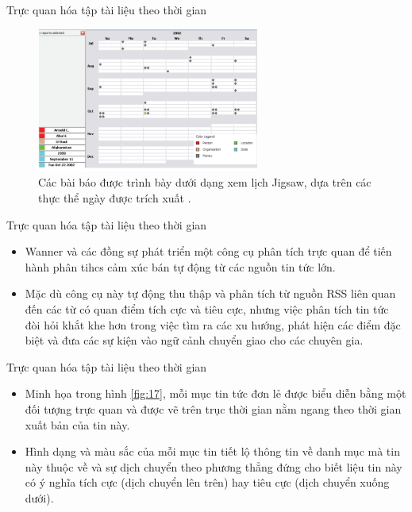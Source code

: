 \documentclass[10pt]{beamer}
\theoremstyle{remark}
\theoremstyle{definition}
\begin{document}
\begin{frame}{Trực quan hóa tập tài liệu theo thời gian}
	\begin{figure}[h!]
        \centering
        \includegraphics[width=0.65\textwidth]{16.png}
        \caption{Các bài báo được trình bày dưới dạng xem lịch Jigsaw, dựa trên các thực thể ngày được trích xuất \cite{155}.}
        \label{fig:16}
    \end{figure}
\end{frame}

\begin{frame}{Trực quan hóa tập tài liệu theo thời gian}
	\begin{itemize}
		\item Wanner và các đồng sự phát triển một công cụ phân tích trực quan để tiến hành phân tihcs cảm xúc bán tự động từ các nguồn tin tức lớn.
		\item Mặc dù công cụ này tự động thu thập và phân tích từ nguồn RSS liên quan đến các từ có quan điểm tích cực và tiêu cực, nhưng việc phân tích tin tức đòi hỏi khắt khe hơn trong việc tìm ra các xu hướng, phát hiện các điểm đặc biệt và đưa các sự kiện vào ngữ cảnh chuyển giao cho các chuyên gia.
	\end{itemize}
\end{frame}

\begin{frame}{Trực quan hóa tập tài liệu theo thời gian}
	\begin{itemize}
		\item Minh họa trong hình \ref{fig:17}, mỗi mục tin tức đơn lẻ được biểu diễn bằng một đối tượng trực quan và được vẽ trên trục thời gian nằm ngang theo thời gian xuất bản của tin này.
		\item Hình dạng và màu sắc của mỗi mục tin tiết lộ thông tin về danh mục mà tin này thuộc về và sự dịch chuyển theo phương thẳng đứng cho biết liệu tin này có ý nghĩa tích cực (dịch chuyển lên trên) hay tiêu cực (dịch chuyển xuống dưới).
	\end{itemize}
\end{frame}
\end{document}
